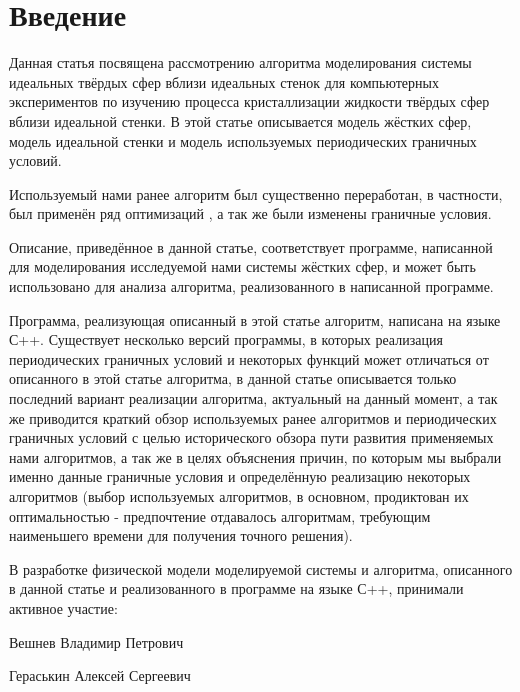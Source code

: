 \documentclass{article}
\begin{document}

\tableofcontents
\pagebreak

\section{Введение}

Данная статья посвящена рассмотрению алгоритма моделирования системы идеальных твёрдых сфер вблизи идеальных стенок для компьютерных экспериментов по изучению процесса кристаллизации жидкости твёрдых сфер вблизи идеальной стенки. В этой статье описывается модель жёстких сфер, модель идеальной стенки и модель используемых периодических граничных условий.

Используемый нами ранее алгоритм \cite{Veshnev_Nurlygayanov_Cristalization_of_hard_spheres_near_the_hard_wall_ru_2011} был существенно переработан, в частности, был применён ряд оптимизаций \cite{Miller_Luding_Event_driven_molecular_dynamics_in_parallel} \cite{Rapaport_The_Event_Driven_Approach_to_N_Body_Simulation} \cite{Belkin_MMD_2006}, а так же были изменены граничные условия.

Описание, приведённое в данной статье, соответствует программе, написанной для моделирования исследуемой нами системы жёстких сфер, и может быть использовано для анализа алгоритма, реализованного в написанной программе.

Программа, реализующая описанный в этой статье алгоритм, написана на языке С++. Существует несколько версий программы, в которых реализация периодических граничных условий и некоторых функций может отличаться от описанного в этой статье алгоритма, в данной статье описывается только последний вариант реализации алгоритма, актуальный на данный момент, а так же приводится краткий обзор используемых ранее алгоритмов и периодических граничных условий с целью исторического обзора пути развития применяемых нами алгоритмов, а так же в целях объяснения причин, по которым мы выбрали именно данные граничные условия и определённую реализацию некоторых алгоритмов (выбор используемых алгоритмов, в основном, продиктован их оптимальностью - предпочтение отдавалось алгоритмам, требующим наименьшего времени для получения точного решения).

В разработке физической модели моделируемой системы и алгоритма, описанного в данной статье и реализованного в программе на языке С++, принимали активное участие:

Вешнев Владимир Петрович

Гераськин Алексей Сергеевич
\end{document}
